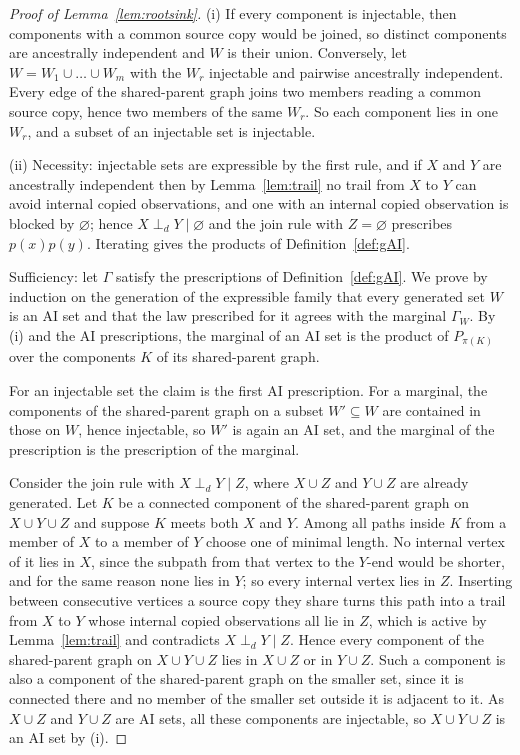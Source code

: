 \begin{proof}[Proof of Lemma~\ref{lem:rootsink}]
(i) If every component is injectable, then components with a common source copy would be joined, so distinct components are ancestrally independent and $W$ is their union. Conversely, let $W=W_1\cup\dots\cup W_m$ with the $W_r$ injectable and pairwise ancestrally independent. Every edge of the shared-parent graph joins two members reading a common source copy, hence two members of the same $W_r$. So each component lies in one $W_r$, and a subset of an injectable set is injectable.

(ii) Necessity: injectable sets are expressible by the first rule, and if $X$ and $Y$ are ancestrally independent then by Lemma~\ref{lem:trail} no trail from $X$ to $Y$ can avoid internal copied observations, and one with an internal copied observation is blocked by $\varnothing$; hence $X\perp_dY\mid\varnothing$ and the join rule with $Z=\varnothing$ prescribes $p(x)p(y)$. Iterating gives the products of Definition~\ref{def:gAI}.

Sufficiency: let $\Gamma$ satisfy the prescriptions of Definition~\ref{def:gAI}. We prove by induction on the generation of the expressible family that every generated set $W$ is an AI set and that the law prescribed for it agrees with the marginal $\Gamma_W$. By (i) and the AI prescriptions, the marginal of an AI set is the product of $P_{\pi(K)}$ over the components $K$ of its shared-parent graph.

For an injectable set the claim is the first AI prescription. For a marginal, the components of the shared-parent graph on a subset $W'\subseteq W$ are contained in those on $W$, hence injectable, so $W'$ is again an AI set, and the marginal of the prescription is the prescription of the marginal.

Consider the join rule with $X\perp_dY\mid Z$, where $X\cup Z$ and $Y\cup Z$ are already generated. Let $K$ be a connected component of the shared-parent graph on $X\cup Y\cup Z$ and suppose $K$ meets both $X$ and $Y$. Among all paths inside $K$ from a member of $X$ to a member of $Y$ choose one of minimal length. No internal vertex of it lies in $X$, since the subpath from that vertex to the $Y$-end would be shorter, and for the same reason none lies in $Y$; so every internal vertex lies in $Z$. Inserting between consecutive vertices a source copy they share turns this path into a trail from $X$ to $Y$ whose internal copied observations all lie in $Z$, which is active by Lemma~\ref{lem:trail} and contradicts $X\perp_dY\mid Z$. Hence every component of the shared-parent graph on $X\cup Y\cup Z$ lies in $X\cup Z$ or in $Y\cup Z$. Such a component is also a component of the shared-parent graph on the smaller set, since it is connected there and no member of the smaller set outside it is adjacent to it. As $X\cup Z$ and $Y\cup Z$ are AI sets, all these components are injectable, so $X\cup Y\cup Z$ is an AI set by (i).


\end{proof}
